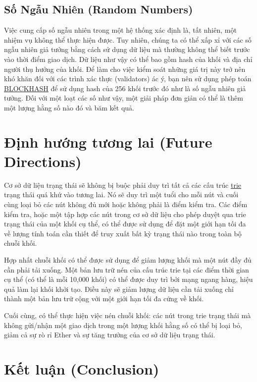 \documentclass[9pt,oneside]{amsart}
\begin{document}
\begin{multicols}{2}
\subsection{Số Ngẫu Nhiên (Random Numbers)}
Việc cung cấp số ngẫu nhiên trong một hệ thống xác định là, tất nhiên, một nhiệm vụ không thể thực hiện được. Tuy nhiên, chúng ta có thể xấp xỉ với các số ngẫu nhiên giả tưởng bằng cách sử dụng dữ liệu mà thường không thể biết trước vào thời điểm giao dịch. Dữ liệu như vậy có thể bao gồm hash của khối và địa chỉ người thụ hưởng của khối. Để làm cho việc kiểm soát những giá trị này trở nên khó khăn đối với các trình xác thực (validators) ác ý, bạn nên sử dụng phép toán {\small \hyperlink{blockhash}{BLOCKHASH}} để sử dụng hash của 256 khối trước đó như là số ngẫu nhiên giả tưởng. Đối với một loạt các số như vậy, một giải pháp đơn giản có thể là thêm một lượng hằng số nào đó và băm kết quả.

\section{Định hướng tương lai (Future Directions)} \label{ch:future}

Cơ sở dữ liệu trạng thái sẽ không bị buộc phải duy trì tất cả các cấu trúc \hyperlink{trie}{trie} trạng thái quá khứ vào tương lai. Nó sẽ duy trì một tuổi cho mỗi nút và cuối cùng loại bỏ các nút không đủ mới hoặc không phải là điểm kiểm tra. Các điểm kiểm tra, hoặc một tập hợp các nút trong cơ sở dữ liệu cho phép duyệt qua trie trạng thái của một khối cụ thể, có thể được sử dụng để đặt một giới hạn tối đa về lượng tính toán cần thiết để truy xuất bất kỳ trạng thái nào trong toàn bộ chuỗi khối.

Hợp nhất chuỗi khối có thể được sử dụng để giảm lượng khối mà một nút đầy đủ cần phải tải xuống. Một bản lưu trữ nén của cấu trúc trie tại các điểm thời gian cụ thể (có thể là mỗi 10,000 khối) có thể được duy trì bởi mạng ngang hàng, hiệu quả làm lại khối khởi tạo. Điều này sẽ giảm lượng dữ liệu cần tải xuống chỉ thành một bản lưu trữ cộng với một giới hạn tối đa cứng về khối.

Cuối cùng, có thể thực hiện việc nén chuỗi khối: các nút trong trie trạng thái mà không gửi/nhận một giao dịch trong một lượng khối hằng số có thể bị loại bỏ, giảm cả sự rò rỉ Ether và sự tăng trưởng của cơ sở dữ liệu trạng thái.

\section{Kết luận (Conclusion)} \label{ch:conclusion}


\end{multicols}
\end{document}
